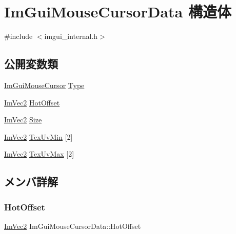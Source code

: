 \hypertarget{struct_im_gui_mouse_cursor_data}{}\section{Im\+Gui\+Mouse\+Cursor\+Data 構造体}
\label{struct_im_gui_mouse_cursor_data}


{\ttfamily \#include $<$imgui\+\_\+internal.\+h$>$}

\subsection*{公開変数類}
\begin{DoxyCompactItemize}
\item 
\mbox{\hyperlink{imgui_8h_a9223d6c82bb5d12c2eab5f829ca520ef}{Im\+Gui\+Mouse\+Cursor}} \mbox{\hyperlink{struct_im_gui_mouse_cursor_data_ab58df812a8caf8741415053515b8f347}{Type}}
\item 
\mbox{\hyperlink{struct_im_vec2}{Im\+Vec2}} \mbox{\hyperlink{struct_im_gui_mouse_cursor_data_ae271e8ec495657c2231d6e47540d3b36}{Hot\+Offset}}
\item 
\mbox{\hyperlink{struct_im_vec2}{Im\+Vec2}} \mbox{\hyperlink{struct_im_gui_mouse_cursor_data_af8dd3ec3de77811d6caf4bfdde085495}{Size}}
\item 
\mbox{\hyperlink{struct_im_vec2}{Im\+Vec2}} \mbox{\hyperlink{struct_im_gui_mouse_cursor_data_add35adb991fcfd03ae33c3607aa0c842}{Tex\+Uv\+Min}} \mbox{[}2\mbox{]}
\item 
\mbox{\hyperlink{struct_im_vec2}{Im\+Vec2}} \mbox{\hyperlink{struct_im_gui_mouse_cursor_data_a30bae90a9e61608c4fd9fe03b5f7390f}{Tex\+Uv\+Max}} \mbox{[}2\mbox{]}
\end{DoxyCompactItemize}


\subsection{メンバ詳解}
\mbox{\label{struct_im_gui_mouse_cursor_data_ae271e8ec495657c2231d6e47540d3b36}} 
\subsubsection{\texorpdfstring{Hot\+Offset}{HotOffset}}
{\footnotesize\ttfamily \mbox{\hyperlink{struct_im_vec2}{Im\+Vec2}} Im\+Gui\+Mouse\+Cursor\+Data\+::\+Hot\+Offset}

